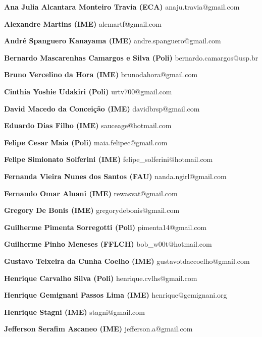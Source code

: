 \documentclass[12pt,onecolumn,a4paper]{article}
\begin{document}
    \begin{list}{}{ %
        \setlength\itemsep{0.02pt}
        \setlength\parsep{0.0pt}
        \setlength{}
        \setlength\leftmargin{3.5in}
        \footnotesize
    }

        \item[\bf Ana Julia Alcantara Monteiro Travia (ECA)] anaju.travia@gmail.com
        \item[\bf Alexandre Martins (IME)] alemartf@gmail.com
        \item[\bf André Spanguero Kanayama (IME)] andre.spanguero@gmail.com
        \item[\bf Bernardo Mascarenhas Camargos e Silva (Poli)] bernardo.camargos@usp.br
        \item[\bf Bruno Vercelino da Hora (IME)] brunodahora@gmail.com
        \item[\bf Cinthia Yoshie Udakiri (Poli)] urtv700@gmail.com
        \item[\bf David Macedo da Conceição (IME)] davidbrsp@gmail.com
        \item[\bf Eduardo Dias Filho (IME)] sauceage@hotmail.com
        \item[\bf Felipe Cesar Maia (Poli)] maia.felipec@gmail.com
        \item[\bf Felipe Simionato Solferini (IME)] felipe\_solferini@hotmail.com
        \item[\bf Fernanda Vieira Nunes dos Santos (FAU)] nanda.ngirl@gmail.com
        \item[\bf Fernando Omar Aluani (IME)] rewasvat@gmail.com
        \item[\bf Gregory De Bonis (IME)] gregorydebonis@gmail.com
        \item[\bf Guilherme Pimenta Sorregotti (Poli)] pimenta14@gmail.com
        \item[\bf Guilherme Pinho Meneses (FFLCH)] bob\_w00t@hotmail.com
        \item[\bf Gustavo Teixeira da Cunha Coelho (IME)] gustavotdaccoelho@gmail.com
        \item[\bf Henrique Carvalho Silva (Poli)] henrique.cvlhs@gmail.com
        \item[\bf Henrique Gemignani Passos Lima (IME)] henrique@gemignani.org
        \item[\bf Henrique Stagni (IME)] stagni@gmail.com
        \item[\bf Jefferson Serafim Ascaneo (IME)] jefferson.a@gmail.com

\end{list}
\end{document}
